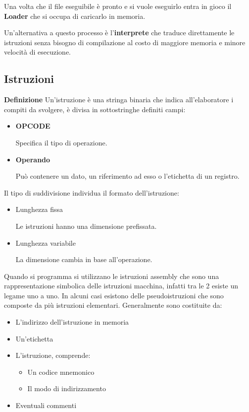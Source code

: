 \documentclass{article}
\begin{document}
\noindent Una volta che il file eseguibile è pronto e si vuole eseguirlo entra in gioco il \textbf{Loader} che si occupa di caricarlo in memoria.\newline

\noindent Un'alternativa a questo processo è l'\textbf{interprete} che traduce direttamente le istruzioni senza bisogno di compilazione al costo di maggiore memoria e minore velocità di esecuzione.\newline

\subsection{Istruzioni}

\textbf{Definizione} Un'istruzione è una stringa binaria che indica all'elaboratore i compiti da svolgere, è divisa in sottostringhe definiti campi:
\begin{itemize}
    \item \textbf{OPCODE}

        Specifica il tipo di operazione.

    \item \textbf{Operando} 

        Può contenere un dato, un riferimento ad esso o l'etichetta di un registro.\newline
    
\end{itemize}

\newpage

\noindent Il tipo di suddivisione individua il formato dell'istruzione:
\begin{itemize}
    \item Lunghezza fissa

        Le istruzioni hanno una dimensione prefissata.

    \item Lunghezza variabile

        La dimensione cambia in base all'operazione.\newline
    
\end{itemize}

\noindent Quando si programma si utilizzano le istruzioni assembly che sono una rappresentazione simbolica delle istruzioni macchina, infatti tra le 2 esiste un legame uno a uno. In alcuni casi esistono delle pseudoistruzioni che sono composte da più istruzioni elementari. Generalmente sono costituite da:
\begin{itemize}
    \item L'indirizzo dell'istruzione in memoria
    \item Un'etichetta
    \item L'istruzione, comprende:
        \begin{itemize}
            \item Un codice mnemonico
            \item Il modo di indirizzamento
        \end{itemize}
    \item Eventuali commenti\newline
\end{itemize}
\end{document}
